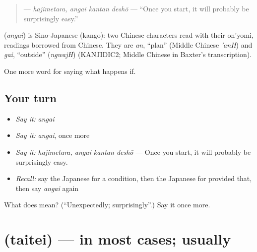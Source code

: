 \begin{quote}
\textbf{ } — \emph{hajimetara, angai kantan deshō} — \textquotedblleft{}Once you start, it will probably be surprisingly easy.\textquotedblright{}
\end{quote}

\begin{cousinweb}
\textbf{} (\emph{angai}) is Sino-Japanese (kango): two Chinese characters read with their on'yomi, readings borrowed from Chinese. They are \emph{an}, \textquotedblleft{}plan\textquotedblright{} (Middle Chinese \emph{'anH}) and \emph{gai}, \textquotedblleft{}outside\textquotedblright{} (\emph{ngwajH}) (KANJIDIC2; Middle Chinese in Baxter's transcription).
\end{cousinweb}

\begin{grammarlens}[title={What you've built}]
One more word for saying what happens if.
\end{grammarlens}

\subsection*{Your turn}
\begin{itemize}
\raggedright
  \item \emph{Say it:} \emph{angai}
  \item \emph{Say it:} \emph{angai}, once more
  \item \emph{Say it:} \emph{hajimetara, angai kantan deshō} — Once you start, it will probably be surprisingly easy.
  \item \emph{Recall:} say the Japanese for a condition, then the Japanese for provided that, then say \emph{angai} again
\end{itemize}

\begin{tcolorbox}[breakable,colback=teal!4,colframe=teal!35!black,title={Before you move on}]
What does  mean? (\textquotedblleft{}Unexpectedly; surprisingly\textquotedblright{}.) Say it once more.
\end{tcolorbox}
\section[\texorpdfstring{\ja{たいてい} (taitei)}{たいてい (taitei)}]{ (taitei) — in most cases; usually}

\label{lesson:JA-C356-taitei}



